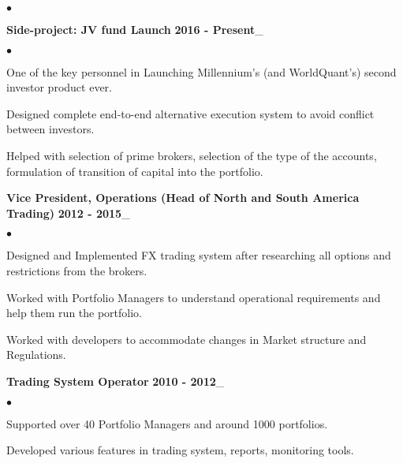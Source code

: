 \documentclass[margin,line]{res}
\newenvironment{list2}{
  \begin{list}{$\bullet$}{%
      \setlength{\itemsep}{0.05in}
      \setlength{\parsep}{0in} \setlength{\parskip}{0in}
      \setlength{\topsep}{-0.1in} \setlength{\partopsep}{0in}
      \setlength{\leftmargin}{0.2in}}}{\end{list}}
\begin{document}
\begin{resume}
\begin{list2}
\end{list2}

{\bf Side-project: JV fund Launch} \hfill {\bf 2016 - Present}\_
\begin{list2}
\item One of the key personnel in Launching Millennium's (and WorldQuant's) second investor product ever.
\item Designed complete end-to-end alternative execution system to avoid conflict between investors.
\item Helped with selection of prime brokers, selection of the type of the accounts, formulation of transition of capital into the portfolio.
\end{list2}


{\bf Vice President, Operations (Head of North and South America Trading)} \hfill {\bf 2012 - 2015}\_
\begin{list2}
\item Designed and Implemented FX trading system after researching all options and restrictions from the brokers.
\item Worked with Portfolio Managers to understand operational requirements and help them run the portfolio.
\item Worked with developers to accommodate changes in Market structure and Regulations.
\end{list2}

{\bf Trading System Operator} \hfill {\bf 2010 - 2012}\_
\begin{list2}
\item Supported over 40 Portfolio Managers and around 1000 portfolios.
\item Developed various features in trading system, reports, monitoring tools.
\end{list2}


\end{resume}
\end{document}
